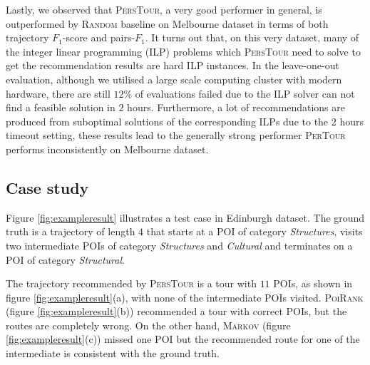 Lastly, we observed that \textsc{PersTour}, a very good performer in general, is outperformed by \textsc{Random} baseline
on Melbourne dataset in terms of both trajectory $F_1$-score and pairs-$F_1$.
It turns out that, on this very dataset, many of the integer linear programming (ILP) problems
which \textsc{PersTour} need to solve to get the recommendation results are hard ILP instances.
In the leave-one-out evaluation, although we utilised a large scale computing cluster with modern hardware,
there are still $12\%$ of evaluations failed due to the ILP solver can not find a feasible solution in $2$ hours.
Furthermore, a lot of recommendations are produced from suboptimal solutions of the corresponding ILPs due to
the $2$ hours timeout setting, these results lead to the generally strong performer \textsc{PerTour} performs
inconsistently on Melbourne dataset.


\subsection{Case study}
\label{sec:casestudy}


Figure \ref{fig:exampleresult} illustrates a test case in Edinburgh dataset.
The ground truth is a trajectory of length $4$ that starts at a POI of category \textit{Structures},
visits two intermediate POIs of category \textit{Structures} and \textit{Cultural} and 
terminates on a POI of category \textit{Structural}.

The trajectory recommended by \textsc{PersTour} is a tour with $11$ POIs, as shown in figure \ref{fig:exampleresult}(a),
with none of the intermediate POIs visited.
\textsc{PoiRank} (figure \ref{fig:exampleresult}(b)) recommended a tour with correct POIs, but the routes are completely wrong.
On the other hand, \textsc{Markov} (figure \ref{fig:exampleresult}(c)) missed one POI but the recommended route for one of 
the intermediate is consistent with the ground truth.

